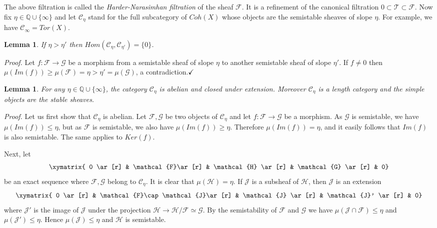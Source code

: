 \documentclass[a4paper,10pt]{amsart}
\def\Q{\mathbb{Q}}
\def\qed{$\hfill \checkmark$}
\newtheorem{lem}[theo]{Lemma}
\numberwithin{equation}{section}
\begin{document}
{\vspace{.15in}

The above filtration is called the \textit{Harder-Narasimhan filtration} of the sheaf $\mathcal{F}$. It is a refinement of the canonical filtration $0 \subset \mathcal{T} \subset \mathcal{F}$. Now fix $\eta \in \Q \cup \{\infty\}$ and let $\mathcal{C}_{\eta}$ stand for the full subcategory of $Coh(X)$ whose objects are the semistable sheaves of slope $\eta$. For example, we have $\mathcal{C}_{\infty}=Tor(X)$.

\vspace{.1in}

\begin{lem}\label{L:extension=0} If $\eta>\eta'$ then $Hom(\mathcal{C}_{\eta},\mathcal{C}_{\eta'})=\{0\}$.\end{lem}
\noindent
\textit{Proof.} Let $f: \mathcal{F}\to\mathcal{G}$ be a morphism from a semistable sheaf of slope $\eta$ to another semistable sheaf of slope $\eta'$. If $f \neq 0$ then $\mu(Im(f))\geq \mu(\mathcal{F})=\eta > \eta'=\mu(\mathcal{G})$, a contradiction.\qed

\vspace{.15in}

\begin{lem} For any $\eta \in \Q \cup \{\infty\}$, the category $\mathcal{C}_{\eta}$ is abelian and closed under extension. Moreover $\mathcal{C}_{\eta}$ is a length category and the simple objects are the stable sheaves. \end{lem}
\noindent
\textit{Proof.} Let us first show that $\mathcal{C}_{\eta}$ is abelian. Let $\mathcal{F},\mathcal{G}$ be two objects of $\mathcal{C}_{\eta}$ and let $f: \mathcal{F}\to \mathcal{G}$ be a morphism. As $\mathcal{G}$ is semistable, we have $\mu(Im(f)) \leq \eta$, but as $\mathcal{F}$ is semistable, we also have $\mu(Im(f)) \geq \eta$. Therefore $\mu(Im(f))=\eta$, and it easily follows that $Im(f)$ is also semistable. The same applies to $Ker(f)$.

Next, let
$$\xymatrix{ 0 \ar[r] & \mathcal{F}\ar[r] & \mathcal{H} \ar[r] & \mathcal{G} \ar[r] & 0}$$
be an exact sequence where $\mathcal{F}, \mathcal{G}$ belong to $\mathcal{C}_{\eta}$. It is clear that
$\mu(\mathcal{H})=\eta$. If $\mathcal{J}$ is a subsheaf of $\mathcal{H}$, then $\mathcal{J}$ is an extension
$$\xymatrix{ 0 \ar[r] & \mathcal{F}\cap \mathcal{J}\ar[r] & \mathcal{J} \ar[r] & \mathcal{J}' \ar[r] & 0}$$
where $\mathcal{J}'$ is the image of $\mathcal{J}$ under the projection $\mathcal{H} \to \mathcal{H} / \mathcal{F} \simeq \mathcal{G}$. By the semistability of $\mathcal{F}$ and $\mathcal{G}$ we have
$\mu(\mathcal{J} \cap \mathcal{F}) \leq \eta$ and $\mu(\mathcal{J}') \leq \eta$. Hence $\mu(\mathcal{J}) \leq \eta$ and $\mathcal{H}$ is semistable.

}
\end{document}
